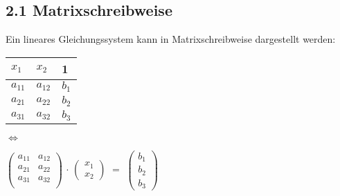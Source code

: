 \subsection{2.1 Matrixschreibweise}{
	
\vskip1pt
Ein lineares Gleichungssystem kann in Matrixschreibweise dargestellt werden:

\vspace{-1mm}
\begin{center}
\begin{minipage}[t]{0.33\columnwidth}
\renewcommand{\arraystretch}{1.1}
  \begin{tabular}{C{2mm}  C{2.5mm} | C{2mm}}
  $x_1$ & $x_2$ & 1 \\ \hline
  $a_{11}$ & $a_{12}$ & $b_1$  \\
  $a_{21}$ & $a_{22}$ &  $b_2$  \\
  $a_{31}$ & $a_{32}$ &  $b_3$  \\
  \end{tabular}
\end{minipage}
\begin{minipage}[t]{0.12 \columnwidth}
$\Longleftrightarrow$
\end{minipage}
\begin{minipage}[t]{0.5 \columnwidth}
$\begin{pmatrix}
  a_{11} & a_{12} \\
  a_{21} & a_{22} \\
  a_{31} & a_{32} \\
\end{pmatrix}$
$\cdot$
$\begin{pmatrix}
x_1 \\
x_2
\end{pmatrix}$
$=$
$\begin{pmatrix}
b_1 \\
b_2 \\
b_3
\end{pmatrix}$
\end{minipage}
\end{center}
}
\WhiteSpace